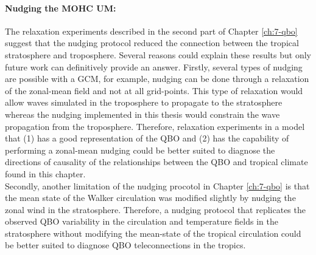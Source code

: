 \paragraph{Nudging the MOHC UM:} 
The relaxation experiments described in the second part of Chapter \ref{ch:7-qbo} suggest that the nudging protocol reduced the connection between the tropical stratosphere and troposphere. 
Several reasons could explain these results but only future work can definitively provide an answer. 
Firstly, several types of nudging are possible with a GCM, for example, nudging can be done through a relaxation of the zonal-mean field and not at all grid-points. 
This type of relaxation would allow waves simulated in the troposphere to propagate to the stratosphere whereas the nudging implemented in this thesis would constrain the wave propagation from the troposphere. 
Therefore, relaxation experiments in a model that (1) has a good representation of the QBO and (2) has the capability of performing a zonal-mean nudging could be better suited to diagnose the directions of causality of the relationships between the QBO and tropical climate found in this chapter.
\\
Secondly, another limitation of the nudging procotol in Chapter \ref{ch:7-qbo} is that the mean state of the Walker circulation was modified slightly by nudging the zonal wind in the stratosphere.
Therefore, a nudging protocol that replicates the observed QBO variability in the circulation and temperature fields in the stratosphere without modifying the mean-state of the tropical circulation could be better suited to diagnose QBO teleconnections in the tropics.

 




